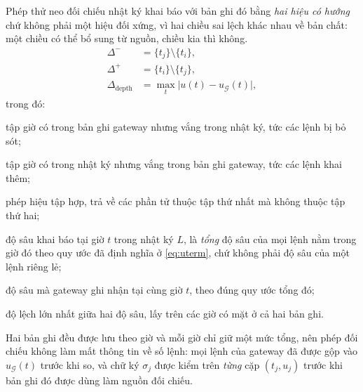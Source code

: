 Phép thử neo đối chiếu nhật ký khai báo với bản ghi đó bằng \emph{hai hiệu có
hướng} chứ không phải một hiệu đối xứng, vì hai chiều sai lệch khác nhau về bản
chất: một chiều có thể bổ sung từ nguồn, chiều kia thì không.
\begin{equation}
\begin{aligned}
\Delta^{-}&=\{t_j\}\setminus\{t_i\},\\
\Delta^{+}&=\{t_i\}\setminus\{t_j\},\\
\Delta_{\mathrm{depth}}&=\max_{t}\bigl|u(t)-u_{\mathcal{G}}(t)\bigr|,
\end{aligned}
\label{eq:deltas}
\end{equation}
trong đó:
\begin{symbolist}
\item[$\Delta^{-}$] tập giờ có trong bản ghi gateway nhưng vắng trong nhật ký, tức các lệnh bị bỏ sót;
\item[$\Delta^{+}$] tập giờ có trong nhật ký nhưng vắng trong bản ghi gateway, tức các lệnh khai thêm;
\item[$\setminus$] phép hiệu tập hợp, trả về các phần tử thuộc tập thứ nhất mà không thuộc tập thứ hai;
\item[$u(t)$] độ sâu khai báo tại giờ $t$ trong nhật ký $L$, là \emph{tổng} độ sâu của mọi lệnh nằm trong giờ đó theo quy ước đã định nghĩa ở \eqref{eq:uterm}, chứ không phải độ sâu của một lệnh riêng lẻ;
\item[$u_{\mathcal{G}}(t)$] độ sâu mà gateway ghi nhận tại cùng giờ $t$, theo đúng quy ước tổng đó;
\item[$\Delta_{\mathrm{depth}}$] độ lệch lớn nhất giữa hai độ sâu, lấy trên các giờ có mặt ở cả hai bản ghi.
\end{symbolist}
Hai bản ghi đều được lưu theo giờ và mỗi giờ chỉ giữ một mức tổng, nên phép đối
chiếu không làm mất thông tin về số lệnh: mọi lệnh của gateway đã được gộp vào
$u_{\mathcal{G}}(t)$ trước khi so, và chữ ký $\sigma_j$ được kiểm trên \emph{từng}
cặp $(t_j,u_j)$ trước khi bản ghi đó được dùng làm nguồn đối chiếu.

